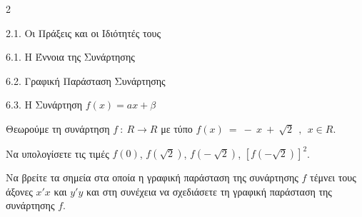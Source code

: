 \begin{ylh}{2}
    \item 2.1. Οι Πράξεις και οι Ιδιότητές τους
    \item 6.1. Η Έννοια της Συνάρτησης
    \item 6.2. Γραφική Παράσταση Συνάρτησης
    \item 6.3. Η Συνάρτηση $f(x)=ax+\beta$
\end{ylh}
Θεωρούμε τη συνάρτηση $f\ :\ R \rightarrow R$ με τύπο $f(x)\  = \  - \ x\  + \ \sqrt{2}\ \ ,\ \ x \in R$.
\begin{alist}
\item Να υπολογίσετε τις τιμές $f(0)$, $f\left( \sqrt{2} \right)$, $f\left( - \ \sqrt{2} \right)$, $\left\lbrack f\left( - \sqrt{2} \right) \right\rbrack^{2}$.
\item Να βρείτε τα σημεία στα οποία η γραφική παράσταση της συνάρτησης $f$ τέμνει τους άξονες $x'x$ και $y'y$ και στη συνέχεια να σχεδιάσετε τη γραφική παράσταση της συνάρτησης $f$.
\end{alist}

